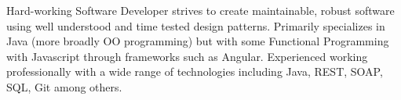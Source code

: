 \cvsection{}


\begin{cvparagraph}

\centering Hard-working Software Developer strives to create maintainable, robust software using well understood and time tested design patterns. Primarily specializes in Java (more broadly OO programming) but with some Functional Programming with Javascript through frameworks such as Angular. Experienced working professionally with a wide range of technologies including Java, REST, SOAP, SQL, Git among others. 
\end{cvparagraph}

\begin{cvparagraph}
\end{cvparagraph}
